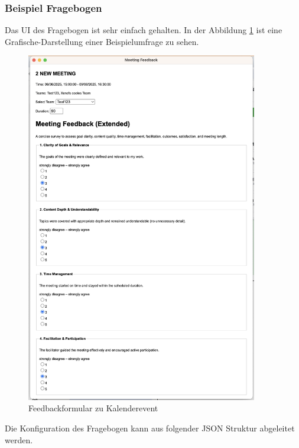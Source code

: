 \documentclass[12pt,a4paper]{report}
\begin{document}
    \subsubsection{Beispiel Fragebogen}
        Das UI des Fragebogen ist sehr einfach gehalten. In der Abbildung \ref{fig:yappi-extension-feedback} ist eine Grafische-Darstellung
        einer Beispielumfrage zu sehen.

        \begin{figure}[H]
          \centering
          \includegraphics[width=0.90\textwidth]{../figures/yappi-chrome-extension/yappi-extension-feedback.jpg}
          \caption{Feedbackformular zu Kalenderevent}
          \label{fig:yappi-extension-feedback}
        \end{figure}

        Die Konfiguration des Fragebogen kann aus folgender JSON Struktur abgeleitet werden.
\end{document}
